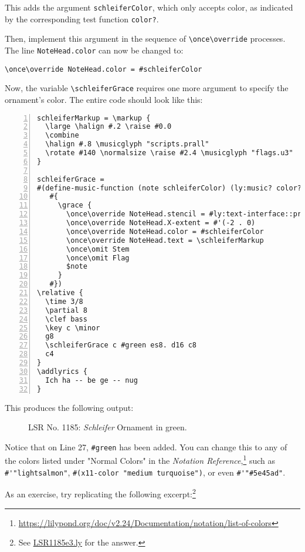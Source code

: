 This adds the argument \verb|schleiferColor|, which only accepts color, as indicated by the corresponding test function \verb|color?|.

Then, implement this argument in the sequence of \verb+\once\override+ processes. The line \verb+NoteHead.color+ can now be changed to:

\begin{verbatim}
\once\override NoteHead.color = #schleiferColor
\end{verbatim}

Now, the variable \verb+\schleiferGrace+ requires one more argument to specify the ornament's color. The entire code should look like this:

\begin{Verbatim}[numbers=left,xleftmargin=5mm]
schleiferMarkup = \markup {
  \large \halign #.2 \raise #0.0
  \combine
  \halign #.8 \musicglyph "scripts.prall"
  \rotate #140 \normalsize \raise #2.4 \musicglyph "flags.u3"
}

schleiferGrace =
#(define-music-function (note schleiferColor) (ly:music? color?)
   #{
     \grace {
       \once\override NoteHead.stencil = #ly:text-interface::print
       \once\override NoteHead.X-extent = #'(-2 . 0)
       \once\override NoteHead.color = #schleiferColor
       \once\override NoteHead.text = \schleiferMarkup
       \once\omit Stem
       \once\omit Flag
       $note
     }
   #})
\relative {
  \time 3/8
  \partial 8
  \clef bass
  \key c \minor
  g8
  \schleiferGrace c #green es8. d16 c8
  c4
}
\addlyrics {
  Ich ha -- be ge -- nug
}
\end{Verbatim}

This produces the following output:

	\begin{figure}[!htb]
	\centering
{}
	\caption{\label{fig:figure3} LSR No. 1185: \textit{Schleifer} Ornament in green.}
	\end{figure}
	
Notice that on Line 27, \verb+#green+ has been added. You can change this to any of the colors listed under "Normal Colors" in the \textit{Notation Reference},\footnote{\url{https://lilypond.org/doc/v2.24/Documentation/notation/list-of-colors}} such as \verb+#'"lightsalmon"+, \verb+#(x11-color "medium turquoise")+, or even \verb+#'"#5e45ad"+.

As an exercise, try replicating the following excerpt:\footnote{See \href{https://github.com/yoshiakionishi/lilypond-snippets/blob/main/DOCUMENT/LSR1185e3.ly}{LSR1185e3.ly} for the answer.}

